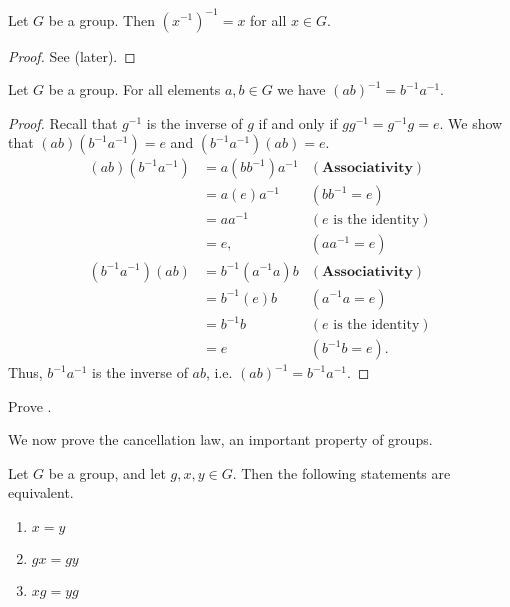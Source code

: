 \begin{proposition}\label{prop-inverse-of-inverse-is-element}
    Let $G$ be a group. Then $\left(x^{-1}\right)^{-1} = x$ for all $x \in G$.
\end{proposition}
\begin{proof}
    See  (later).
\end{proof}

\begin{theorem}
    Let $G$ be a group. For all elements $a, b \in G$ we have $(ab)^{-1} = b^{-1}a^{-1}$.
\end{theorem}
\begin{proof}
    Recall that $g^{-1}$ is the inverse of $g$ if and only if $gg^{-1} = g^{-1}g = e$. We show that $(ab)(b^{-1}a^{-1}) = e$ and $(b^{-1}a^{-1})(ab) = e$.
    \begin{align*}
        (ab)(b^{-1}a^{-1}) &= a(bb^{-1})a^{-1} & (\textbf{Associativity})\\
        &= a(e)a^{-1} & (bb^{-1} = e)\\
        &= aa^{-1} & (e \text{ is the identity})\\
        &= e, & (aa^{-1} = e)\\
        (b^{-1}a^{-1})(ab) &= b^{-1}(a^{-1}a)b & (\textbf{Associativity})\\
        &= b^{-1}(e)b & (a^{-1}a = e)\\
        &= b^{-1}b & (e \text{ is the identity})\\
        &= e & ( b^{-1}b = e).
    \end{align*}
    Thus, $b^{-1}a^{-1}$ is the inverse of $ab$, i.e. $(ab)^{-1} = b^{-1}a^{-1}$.
\end{proof}

\begin{exercise}\label{exercise-inverse-of-inverse-is-element}
    Prove .
\end{exercise}



We now prove the cancellation law, an important property of groups.
\begin{proposition}
    Let $G$ be a group, and let $g, x, y \in G$. Then the following statements are equivalent.
    \begin{enumerate}
        \item $x = y$
        \item $gx = gy$
        \item $xg = yg$
    \end{enumerate}
\end{proposition}

